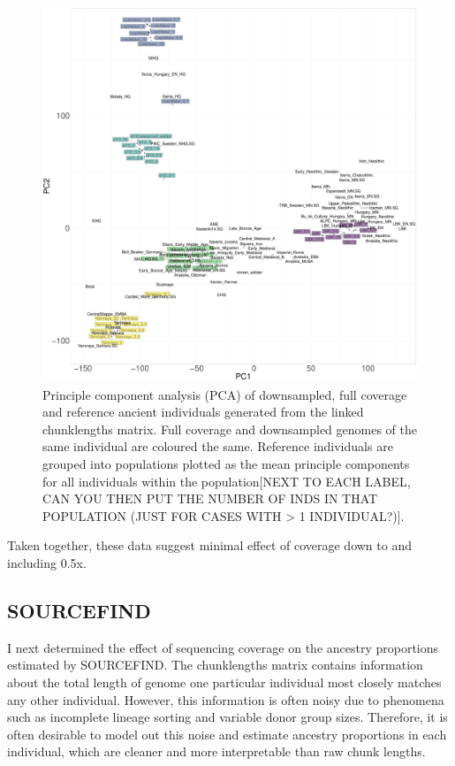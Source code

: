 \begin{figure}[htp]
    \centering
    \includegraphics[width=1.0\textwidth]{../images/chapter1/PCA_panel_allInds.allCoverage.pdf}
    \caption{Principle component analysis (PCA) of downsampled, full coverage and reference ancient individuals generated from the linked chunklengths matrix. Full coverage and downsampled genomes of the same individual are coloured the same. Reference individuals are grouped into populations plotted as the mean principle components for all individuals within the population{\color{red}[NEXT TO EACH LABEL, CAN YOU THEN PUT THE NUMBER OF INDS IN THAT POPULATION (JUST FOR CASES WITH > 1 INDIVIDUAL?)].}}
    \label{fig:PCA_panel_allInds_allCoverage}
\end{figure}

Taken together, these data suggest minimal effect of coverage down to and including 0.5x.

\subsection{SOURCEFIND}

I next determined the effect of sequencing coverage on the ancestry proportions estimated by SOURCEFIND. The chunklengths matrix contains information about the total length of genome one particular individual most closely matches any other individual. However, this information is often noisy due to phenomena such as incomplete lineage sorting and variable donor group sizes. Therefore, it is often desirable to model out this noise and estimate ancestry proportions in each individual, which are cleaner and more interpretable than raw chunk lengths. 

